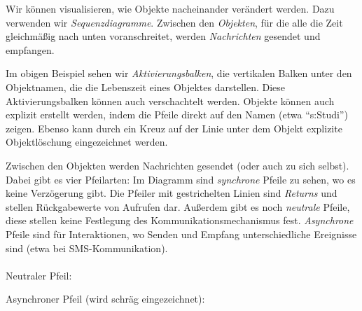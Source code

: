 \documentclass{panikzettel}
\begin{document}
Wir können visualisieren, wie Objekte nacheinander verändert werden.
Dazu verwenden wir \emph{Sequenzdiagramme}.
Zwischen den \emph{Objekten}, für die alle die Zeit gleichmäßig nach unten voranschreitet, werden \emph{Nachrichten} gesendet und empfangen.


Im obigen Beispiel sehen wir \emph{Aktivierungsbalken}, die vertikalen Balken unter den Objektnamen, die die Lebenszeit eines Objektes darstellen.
Diese Aktivierungsbalken können auch verschachtelt werden.
Objekte können auch explizit erstellt werden, indem die Pfeile direkt auf den Namen (etwa ``s:Studi'') zeigen.
Ebenso kann durch ein Kreuz auf der Linie unter dem Objekt explizite Objektlöschung eingezeichnet werden.

Zwischen den Objekten werden Nachrichten gesendet (oder auch zu sich selbst).
Dabei gibt es vier Pfeilarten: Im Diagramm sind \emph{synchrone} Pfeile zu sehen, wo es keine Verzögerung gibt.
Die Pfeiler mit gestrichelten Linien sind \emph{Returns} und stellen Rückgabewerte von Aufrufen dar.
Außerdem gibt es noch \emph{neutrale} Pfeile, diese stellen keine Festlegung des Kommunikationsmechanismus fest.
\emph{Asynchrone} Pfeile sind für Interaktionen, wo Senden und Empfang unterschiedliche Ereignisse sind (etwa bei SMS-Kommunikation).
~\\~\\
Neutraler Pfeil: 

Asynchroner Pfeil (wird schräg eingezeichnet): 
\end{document}
